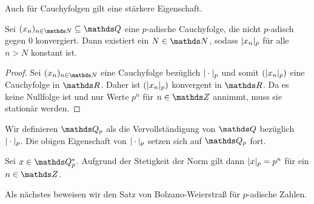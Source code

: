 
Auch für Cauchyfolgen gilt eine stärkere Eigenschaft.

\begin{satz}
Sei $(x_n)_{n \in \N} \subseteq \Q$ eine $p$-adische Cauchyfolge, die nicht $p$-adisch gegen $0$ konvergiert.
Dann existiert ein $N \in \N$, sodass $|x_n|_p$ für alle $n>N$ konstant ist.
\begin{proof}
Sei $(x_n)_{n\in \N}$ eine Cauchyfolge bezüglich $|\cdot|_p$ und somit $(|x_n|_p)$ eine Cauchyfolge in $\R$.
Daher ist $(|x_n|_p)$ konvergent in $\R$. Da es keine Nullfolge ist und nur Werte $p^n$ für $n\in \Z$ annimmt, muss sie stationär werden.
\end{proof}
\end{satz}

\begin{defi}\label{def:Qp}
Wir definieren $\Q_p$ als die Vervollständigung von $\Q$ bezüglich $|\cdot|_p$.
Die obigen Eigenschaft von $|\cdot|_p$ setzen sich auf $\Q_p$ fort.
\end{defi}

\begin{bsp}
Sei $x\in \Q_p^\ast$. Aufgrund der Stetigkeit der Norm gilt dann $|x|_p=p^n$ für ein $n\in \Z$.
\end{bsp}
Als nächstes beweisen wir den Satz von Bolzano-Weierstraß für $p$-adische Zahlen.

